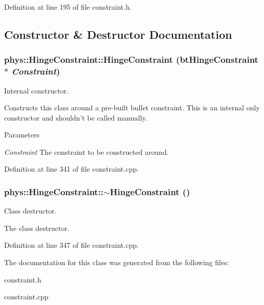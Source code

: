 Definition at line 195 of file constraint.h.



\subsection{Constructor \& Destructor Documentation}
\hypertarget{classphys_1_1HingeConstraint_ab326e7128413aa3b737b726b3513c8df}{
\subsubsection[{HingeConstraint}]{\setlength{\rightskip}{0pt plus 5cm}phys::HingeConstraint::HingeConstraint (btHingeConstraint $\ast$ {\em Constraint})}}
\label{d3/d0d/classphys_1_1HingeConstraint_ab326e7128413aa3b737b726b3513c8df}


Internal constructor. 

Constructs this class around a pre-\/built bullet constraint. This is an internal only constructor and shouldn't be called manually. 
\begin{DoxyParams}{Parameters}
\item[{\em Constraint}]The constraint to be constructed around. \end{DoxyParams}


Definition at line 341 of file constraint.cpp.

\hypertarget{classphys_1_1HingeConstraint_af97da06f82fa1903bb20393760f4ae34}{
\subsubsection[{$\sim$HingeConstraint}]{\setlength{\rightskip}{0pt plus 5cm}phys::HingeConstraint::$\sim$HingeConstraint ()}}
\label{d3/d0d/classphys_1_1HingeConstraint_af97da06f82fa1903bb20393760f4ae34}


Class destructor. 

The class destructor. 

Definition at line 347 of file constraint.cpp.



The documentation for this class was generated from the following files:\begin{DoxyCompactItemize}
\item 
constraint.h\item 
constraint.cpp\end{DoxyCompactItemize}
